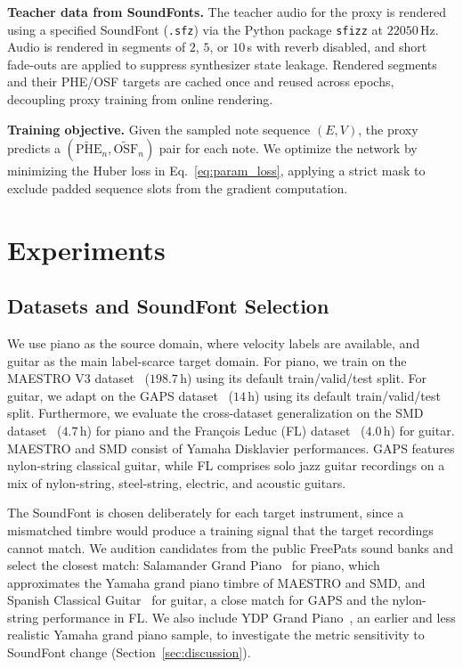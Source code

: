 \documentclass{article}
\begin{document}
\textbf{Teacher data from SoundFonts.}
The teacher audio for the proxy is rendered using a specified SoundFont (\texttt{.sfz}) via the Python package \texttt{sfizz} at $22050$\,Hz. Audio is rendered in segments of $2$, $5$, or $10$\,s with reverb disabled, and short fade-outs are applied to suppress synthesizer state leakage. Rendered segments and their PHE/OSF targets are cached once and reused across epochs, decoupling proxy training from online rendering.
 
\textbf{Training objective.}
Given the sampled note sequence $(E,V)$, the proxy predicts a $(\widetilde{\mathrm{PHE}}_n, \widetilde{\mathrm{OSF}}_n)$ pair for each note. We optimize the network by minimizing the Huber loss in Eq.~\eqref{eq:param_loss}, applying a strict mask to exclude padded sequence slots from the gradient computation.

 
\section{Experiments}
\label{sec:experiments}
 
\subsection{Datasets and SoundFont Selection}
\label{sec:datasets}
We use piano as the source domain, where velocity labels are available, and guitar as the main label-scarce target domain. For piano, we train on the MAESTRO V3 dataset~\cite{hawthorne2019maestro} ($198.7$\,h) using its default train/valid/test split. For guitar, we adapt on the GAPS dataset~\cite{riley2024gaps} ($14$\,h) using its default train/valid/test split. Furthermore, we evaluate the cross-dataset generalization on the SMD dataset~\cite{smd} ($4.7$\,h) for piano and the Fran\c{c}ois Leduc (FL) dataset~\cite{riley2024high} ($4.0$\,h) for guitar. MAESTRO and SMD consist of Yamaha Disklavier performances. GAPS features nylon-string classical guitar, while FL comprises solo jazz guitar recordings on a mix of nylon-string, steel-string, electric, and acoustic guitars.
 
The SoundFont is chosen deliberately for each target instrument, since a mismatched timbre would produce a training signal that the target recordings cannot match. We audition candidates from the public FreePats sound banks and select the closest match: Salamander Grand Piano~\cite{sf_salamander} for piano, which approximates the Yamaha grand piano timbre of MAESTRO and SMD, and Spanish Classical Guitar~\cite{sf_spanishguitar} for guitar, a close match for GAPS and the nylon-string performance in FL. We also include YDP Grand Piano~\cite{sf_ydpgrand}, an earlier and less realistic Yamaha grand piano sample, to investigate the metric sensitivity to SoundFont change (Section~\ref{sec:discussion}).
 
\end{document}
